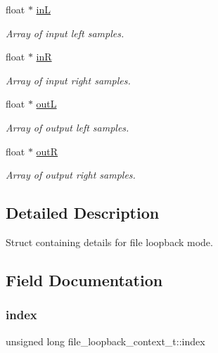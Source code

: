 \begin{DoxyCompactItemize}
float $\ast$ \mbox{\hyperlink{structfile__loopback__context__t_a1b32087e30d7324c8069583b3390a919}{inL}}
\begin{DoxyCompactList}\small\item\em Array of input left samples. \end{DoxyCompactList}\item 
float $\ast$ \mbox{\hyperlink{structfile__loopback__context__t_aa62c08894838205cbfc5ebd2745bf88c}{inR}}
\begin{DoxyCompactList}\small\item\em Array of input right samples. \end{DoxyCompactList}\item 
float $\ast$ \mbox{\hyperlink{structfile__loopback__context__t_af2a4e77bb31f6b8cddf00af17c3e12f4}{outL}}
\begin{DoxyCompactList}\small\item\em Array of output left samples. \end{DoxyCompactList}\item 
float $\ast$ \mbox{\hyperlink{structfile__loopback__context__t_a91ec30b41cc5e8d834d5680f78ec80aa}{outR}}
\begin{DoxyCompactList}\small\item\em Array of output right samples. \end{DoxyCompactList}\end{DoxyCompactItemize}


\subsection{Detailed Description}
Struct containing details for file loopback mode. 

\subsection{Field Documentation}
\mbox{\label{structfile__loopback__context__t_a3510ddf92f42289c2997199a89eb9e23}} 
\subsubsection{\texorpdfstring{index}{index}}
{\footnotesize\ttfamily unsigned long file\+\_\+loopback\+\_\+context\+\_\+t\+::index}



